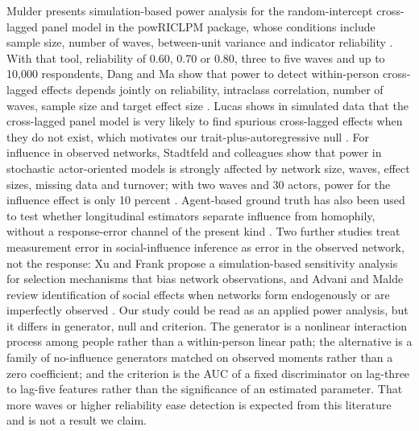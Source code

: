 Mulder presents simulation-based power analysis for the random-intercept cross-lagged panel model in the powRICLPM package, whose conditions include sample size, number of waves, between-unit variance and indicator reliability \cite{mulder2023}.
With that tool, reliability of 0.60, 0.70 or 0.80, three to five waves and up to 10,000 respondents, Dang and Ma show that power to detect within-person cross-lagged effects depends jointly on reliability, intraclass correlation, number of waves, sample size and target effect size \cite{dang2026}.
Lucas shows in simulated data that the cross-lagged panel model is very likely to find spurious cross-lagged effects when they do not exist, which motivates our trait-plus-autoregressive null \cite{lucas2023}.
For influence in observed networks, Stadtfeld and colleagues show that power in stochastic actor-oriented models is strongly affected by network size, waves, effect sizes, missing data and turnover; with two waves and 30 actors, power for the influence effect is only 10 percent \cite{stadtfeld2020}.
Agent-based ground truth has also been used to test whether longitudinal estimators separate influence from homophily, without a response-error channel of the present kind \cite{zachrison2016,daza2021}.
Two further studies treat measurement error in social-influence inference as error in the observed network, not the response: Xu and Frank propose a simulation-based sensitivity analysis for selection mechanisms that bias network observations, and Advani and Malde review identification of social effects when networks form endogenously or are imperfectly observed \cite{xu2021sensitivity,advani2018credibly}.
Our study could be read as an applied power analysis, but it differs in generator, null and criterion.
The generator is a nonlinear interaction process among people rather than a within-person linear path; the alternative is a family of no-influence generators matched on observed moments rather than a zero coefficient; and the criterion is the AUC of a fixed discriminator on lag-three to lag-five features rather than the significance of an estimated parameter.
That more waves or higher reliability ease detection is expected from this literature and is not a result we claim.

